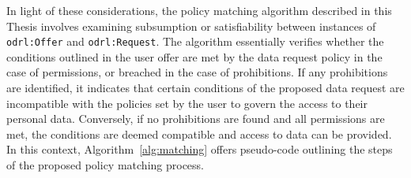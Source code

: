 In light of these considerations, the policy matching algorithm described in this Thesis involves examining subsumption or satisfiability between instances of \texttt{odrl:Offer} and \texttt{odrl:Request}.
The algorithm essentially verifies whether the conditions outlined in the user offer are met by the data request policy in the case of permissions, or breached in the case of prohibitions.
If any prohibitions are identified, it indicates that certain conditions of the proposed data request are incompatible with the policies set by the user to govern the access to their personal data.
Conversely, if no prohibitions are found and all permissions are met, the conditions are deemed compatible and access to data can be provided.
In this context, Algorithm~\ref{alg:matching} offers pseudo-code outlining the steps of the proposed policy matching process.

